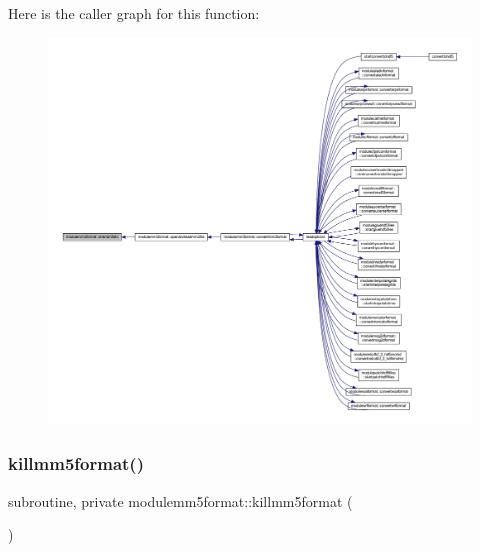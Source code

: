 Here is the caller graph for this function\+:\nopagebreak
\begin{figure}[H]
\begin{center}
\leavevmode
\includegraphics[width=350pt]{namespacemodulemm5format_ae5ec2f854445619a5a7132875dc4d803_icgraph}
\end{center}
\end{figure}
\mbox{\label{namespacemodulemm5format_a2c04440614e11a95fbe1732cd8110590}} 
\subsubsection{\texorpdfstring{killmm5format()}{killmm5format()}}
{\footnotesize\ttfamily subroutine, private modulemm5format\+::killmm5format (\begin{DoxyParamCaption}{ }\end{DoxyParamCaption})\hspace{0.3cm}{\ttfamily [private]}}

